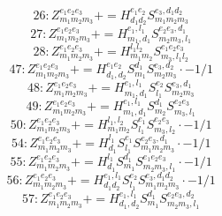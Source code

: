 \documentclass[letterpaper,10pt,fleqn,leqno,onecolumn]{article}
\begin{document}
\begin{equation} \;\;\;\;\;\;  26: Z^{e_{1}e_{2}e_{3}}_{m_{1}m_{2}m_{3}}+=H^{e_{1}e_{2}}_{d_{1}d_{2}}S^{e_{3},d_{1}d_{2}}_{m_{1}m_{2}m_{3}} \end{equation}
\begin{equation} \;\;\;\;\;\;  27: Z^{e_{1}e_{2}e_{3}}_{m_{1}m_{2}m_{3}}+=H^{e_{1},l_{1}}_{m_{1},d_{1}}S^{e_{2}e_{3},d_{1}}_{m_{2}m_{3},l_{1}} \end{equation}
\begin{equation} \;\;\;\;\;\;  28: Z^{e_{1}e_{2}e_{3}}_{m_{1}m_{2}m_{3}}+=H^{l_{1}l_{2}}_{m_{1}m_{2}}S^{e_{1}e_{2}e_{3}}_{m_{3},l_{1}l_{2}} \end{equation}
\begin{equation} \;\;\;\;\;\;  47: Z^{e_{1}e_{2}e_{3}}_{m_{1}m_{2}m_{3}}+=H^{e_{1}e_{2}}_{d_{1},d_{2}}S^{d_{1}}_{m_{1}}S^{e_{3},d_{2}}_{m_{2}m_{3}}\cdot -1/1 \end{equation}
\begin{equation} \;\;\;\;\;\;  48: Z^{e_{1}e_{2}e_{3}}_{m_{1}m_{2}m_{3}}+=H^{e_{1},l_{1}}_{m_{1},d_{1}}S^{e_{2}}_{l_{1}}S^{e_{3},d_{1}}_{m_{2}m_{3}} \end{equation}
\begin{equation} \;\;\;\;\;\;  49: Z^{e_{1}e_{2}e_{3}}_{m_{1}m_{2}m_{3}}+=H^{e_{1},l_{1}}_{m_{1},d_{1}}S^{d_{1}}_{m_{2}}S^{e_{2}e_{3}}_{m_{3},l_{1}} \end{equation}
\begin{equation} \;\;\;\;\;\;  50: Z^{e_{1}e_{2}e_{3}}_{m_{1}m_{2}m_{3}}+=H^{l_{1},l_{2}}_{m_{1}m_{2}}S^{e_{1}}_{l_{1}}S^{e_{2}e_{3}}_{m_{3},l_{2}}\cdot -1/1 \end{equation}
\begin{equation} \;\;\;\;\;\;  54: Z^{e_{1}e_{2}e_{3}}_{m_{1}m_{2}m_{3}}+=H^{l_{1}}_{d_{1}}S^{e_{1}}_{l_{1}}S^{e_{2}e_{3},d_{1}}_{m_{1}m_{2}m_{3}}\cdot -1/1 \end{equation}
\begin{equation} \;\;\;\;\;\;  55: Z^{e_{1}e_{2}e_{3}}_{m_{1}m_{2}m_{3}}+=H^{l_{1}}_{d_{1}}S^{d_{1}}_{m_{1}}S^{e_{1}e_{2}e_{3}}_{m_{2}m_{3},l_{1}}\cdot -1/1 \end{equation}
\begin{equation} \;\;\;\;\;\;  56: Z^{e_{1}e_{2}e_{3}}_{m_{1}m_{2}m_{3}}+=H^{e_{1},l_{1}}_{d_{1}d_{2}}S^{e_{2}}_{l_{1}}S^{e_{3},d_{1}d_{2}}_{m_{1}m_{2}m_{3}}\cdot -1/1 \end{equation}
\begin{equation} \;\;\;\;\;\;  57: Z^{e_{1}e_{2}e_{3}}_{m_{1}m_{2}m_{3}}+=H^{e_{1},l_{1}}_{d_{1},d_{2}}S^{d_{1}}_{m_{1}}S^{e_{2}e_{3},d_{2}}_{m_{2}m_{3},l_{1}} \end{equation}
\end{document}

